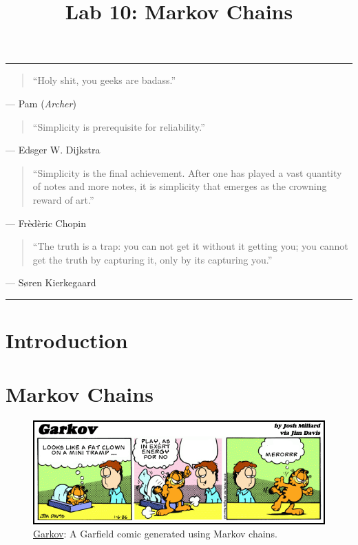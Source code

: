 \documentclass[11pt]{cselabheader}
\title{Lab 10: Markov Chains}
\begin{document}
\maketitle

\hrule
\begin{quotation}
``Holy shit, you geeks are badass.''
\end{quotation}
\begin{flushright}
  --- Pam (\emph{Archer})
\end{flushright}

\begin{quotation}
``Simplicity is prerequisite for reliability.''
\end{quotation}
\begin{flushright}
--- Edsger W. Dijkstra
\end{flushright}

\begin{quotation}
``Simplicity is the final achievement. After one has played a vast quantity of
notes and more notes, it is simplicity that emerges as the crowning reward of
art.''
\end{quotation}
\begin{flushright}
--- Fr\`ed\`eric Chopin
\end{flushright}

\begin{quotation}
``The truth is a trap: you can not get it without it getting you; you cannot get
the truth by capturing it, only by its capturing you.''
\end{quotation}
\begin{flushright}
--- S{\o}ren Kierkegaard
\end{flushright}

\hrule

\section{Introduction}


\section{Markov Chains}
\label{sec:markov}

\begin{figure}
  \centering
  \includegraphics[width=\linewidth]{img/garkov}
  \caption{\href{http://joshmillard.com/garkov/}{Garkov}: A Garfield comic generated using Markov chains.}
  \label{garkov}
\end{figure}
\end{document}
